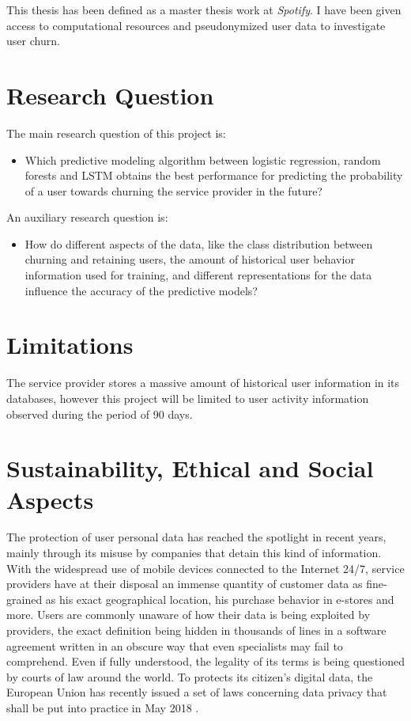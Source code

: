 \documentclass{kththesis}
\begin{document}
	This thesis has been defined as a master thesis work at \emph{Spotify}. I have been given access to computational resources and pseudonymized user data to investigate user churn.
      
\section{Research Question}	
	
The main research question of this project is:

\begin{itemize}
\item Which predictive modeling algorithm between logistic regression, random forests and LSTM obtains the best performance for predicting the probability of a user towards churning the service provider in the future?
\end{itemize}	

An auxiliary research question is:

\begin{itemize}
\item How do different aspects of the data, like the class distribution between churning and retaining users, the amount of historical user behavior information used for training, and different representations for the data influence the accuracy of the predictive models?
\end{itemize}

\section{Limitations}

The service provider stores a massive amount of historical user information in its databases, however this project will be limited to user activity information observed during the period of 90 days.

\section{Sustainability, Ethical and Social Aspects}

The protection of user personal data has reached the spotlight in recent years, mainly through its misuse by companies that detain this kind of information. With the widespread use of mobile devices connected to the Internet 24/7, service providers have at their disposal an immense quantity of customer data as fine-grained as his exact geographical location, his purchase behavior in e-stores and more. Users are commonly unaware of how their data is being exploited by providers, the exact definition being hidden in thousands of lines in a software agreement written in an obscure way that even specialists may fail to comprehend. Even if fully understood, the legality of its terms is being questioned by courts of law around the world. To protects its citizen's digital data, the European Union has recently issued a set of laws concerning data privacy that shall be put into practice in May 2018 \citep{eu2017protection}.
\end{document}
